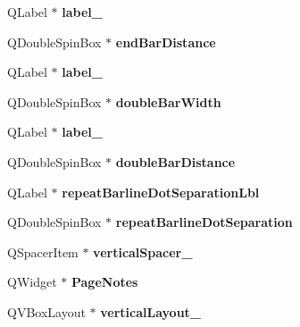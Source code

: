 \begin{DoxyCompactItemize}
Q\+Label $\ast$ {\bfseries label\+\_}
\item 
\mbox{\label{class_ui___edit_style_base_a69e13ca4150ca7a933e6436ab1209bca}} 
Q\+Double\+Spin\+Box $\ast$ {\bfseries end\+Bar\+Distance}
\item 
\mbox{\label{class_ui___edit_style_base_aa82e607870bef74d00b6407362b092f2}} 
Q\+Label $\ast$ {\bfseries label\+\_}
\item 
\mbox{\label{class_ui___edit_style_base_a2be00546d1b5bcadbb9f7d56f44304bc}} 
Q\+Double\+Spin\+Box $\ast$ {\bfseries double\+Bar\+Width}
\item 
\mbox{\label{class_ui___edit_style_base_a2332bedf38369eed9ccb255a2e344bbc}} 
Q\+Label $\ast$ {\bfseries label\+\_}
\item 
\mbox{\label{class_ui___edit_style_base_ade78f2d54df2a2d2591fcde5ac027305}} 
Q\+Double\+Spin\+Box $\ast$ {\bfseries double\+Bar\+Distance}
\item 
\mbox{\label{class_ui___edit_style_base_a2326b4428a8902ac8fc2910b4a489ae7}} 
Q\+Label $\ast$ {\bfseries repeat\+Barline\+Dot\+Separation\+Lbl}
\item 
\mbox{\label{class_ui___edit_style_base_a451ba776ea384a6e052500d123c4b7e7}} 
Q\+Double\+Spin\+Box $\ast$ {\bfseries repeat\+Barline\+Dot\+Separation}
\item 
\mbox{\label{class_ui___edit_style_base_ae0156a68abdf560947c9599c1126a916}} 
Q\+Spacer\+Item $\ast$ {\bfseries vertical\+Spacer\+\_}
\item 
\mbox{\label{class_ui___edit_style_base_a6586449586dfb89c74bd60f18cd6922e}} 
Q\+Widget $\ast$ {\bfseries Page\+Notes}
\item 
\mbox{\label{class_ui___edit_style_base_ab814e8232e7b88827f3d5c0738e97432}} 
Q\+V\+Box\+Layout $\ast$ {\bfseries vertical\+Layout\+\_}
\item 

\end{DoxyCompactItemize}
